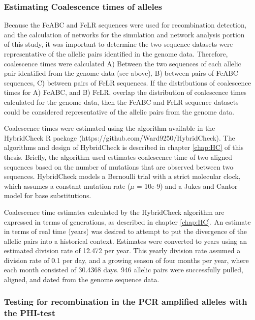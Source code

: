 \subsubsection{Estimating Coalescence times of alleles}

Because the FcABC and FcLR sequences were used for recombination detection,
and the calculation of networks for the simulation and network analysis portion
of this study, it was important to determine the two sequence datasets were
representative of the allelic pairs identified in the genome data.
Therefore, coalescence times were calculated A) Between the two sequences of
each allelic pair identified from the genome data (see above), B) between pairs
of FcABC sequences, C) between pairs of FcLR sequences.
If the distributions of coalescence times for A) FcABC, and B) FcLR, overlap
the distribution of coalescence times calculated for the genome data, then the
FcABC and FcLR sequence datasets could be considered representative of the
allelic pairs from the genome data.

Coalescence times were estimated using the algorithm available in the
HybridCheck R package (https://github.com/Ward9250/HybridCheck).
The algorithms and design of HybridCheck is described in chapter \ref{chap:HC} of this
thesis. Briefly, the algorithm used estimates coalescence time of two aligned
sequences based on the number of mutations that are observed between two
sequences. HybridCheck models a Bernoulli trial with a strict molecular clock,
which assumes a constant mutation rate ($\mu$ = 10e-9) and a Jukes and Cantor model
for base substitutions.

Coalescence time estimates calculated by the HybridCheck algorithm are expressed
in terms of generations, as described in chapter \ref{chap:HC}.
An estimate in terms of real time (years) was desired to attempt to put the
divergence of the allelic pairs into a historical context.
Estimates were converted to years using an estimated division rate of 12.472
per year. This yearly division rate assumed a division rate of 0.1 per day,
and a growing season of four months per year, where each month consisted of
30.4368 days. 946 allelic pairs were successfully pulled, aligned, and dated
from the genome sequence data.


\subsubsection{Testing for recombination in the PCR amplified alleles with the PHI-test}

